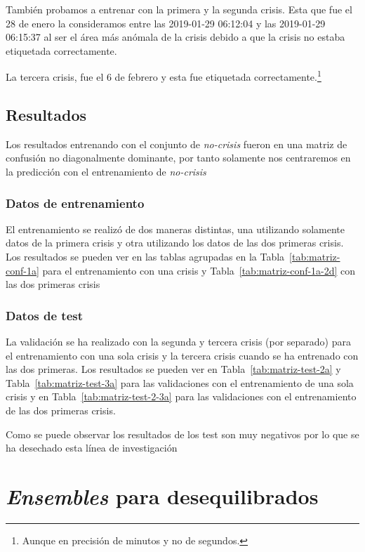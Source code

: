 \documentclass[a4paper,12pt,twoside,oldfontcommands]{memoir}
\begin{document}
	También probamos a entrenar con la primera y la segunda crisis. Esta que fue el 28 de enero la consideramos entre las 2019-01-29 06:12:04 y las 2019-01-29 06:15:37 al ser el área más anómala de la crisis debido a que la crisis no estaba etiquetada correctamente.
	
	La tercera crisis, fue el 6 de febrero y esta fue etiquetada correctamente.\footnote{Aunque en precisión de minutos y no de segundos.}
	
	\section{Resultados}
	Los resultados entrenando con el conjunto de \textit{no-crisis} fueron en una matriz de confusión no diagonalmente dominante, por tanto solamente nos centraremos en la predicción con el entrenamiento de \textit{no-crisis}
	\subsection{Datos de entrenamiento}
	El entrenamiento se realizó de dos maneras distintas, una utilizando solamente datos de la primera crisis y otra utilizando los datos de las dos primeras crisis. Los resultados se pueden ver en las tablas agrupadas en la Tabla~\ref{tab:matriz-conf-1a} para el entrenamiento con una crisis y Tabla~\ref{tab:matriz-conf-1a-2d} con las dos primeras crisis
	
	
	\subsection{Datos de test}
	La validación se ha realizado con la segunda y tercera crisis (por separado) para el entrenamiento con una sola crisis y la tercera crisis cuando se ha entrenado con las dos primeras. Los resultados se pueden ver en Tabla~\ref{tab:matriz-test-2a} y Tabla~\ref{tab:matriz-test-3a} para las validaciones con el entrenamiento de una sola crisis y en Tabla~\ref{tab:matriz-test-2-3a} para las validaciones con el entrenamiento de las dos primeras crisis.
	
	
	Como se puede observar los resultados de los test son muy negativos por lo que se ha desechado esta línea de investigación
	
	\chapter{\textit{Ensembles} para desequilibrados}\label{chap:ensdes}
\end{document}
